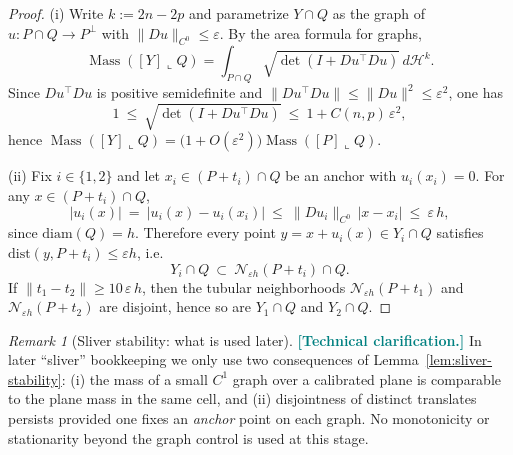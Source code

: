 \documentclass[11pt]{article}
\newcommand{\REVMZ}[1]{\textcolor{teal}{#1}}  %
\numberwithin{equation}{section}  %
\theoremstyle{plain}
\theoremstyle{definition}
\theoremstyle{remark}
\newtheorem{remark}[theorem]{Remark}
\DeclareMathOperator{\Mass}{Mass}
\newcommand{\dist}{\mathrm{dist}}
\begin{document}
\begin{proof}

\textnormal{(i)} Write $k:=2n-2p$ and parametrize $Y\cap Q$ as the graph of $u:P\cap Q\to P^\perp$ with $\|Du\|_{C^0}\le\varepsilon$.
By the area formula for graphs,
\[
\Mass([Y]\llcorner Q)
=\int_{P\cap Q}\sqrt{\det(I+Du^\top Du)}\,d\mathcal H^{k}.
\]
Since $Du^\top Du$ is positive semidefinite and $\|Du^\top Du\|\le \|Du\|^2\le \varepsilon^2$, one has
\[
1\ \le\ \sqrt{\det(I+Du^\top Du)}\ \le\ 1+C(n,p)\,\varepsilon^2,
\]
hence $\Mass([Y]\llcorner Q)=\bigl(1+O(\varepsilon^2)\bigr)\Mass([P]\llcorner Q)$.

\textnormal{(ii)} Fix $i\in\{1,2\}$ and let $x_i\in (P+t_i)\cap Q$ be an anchor with $u_i(x_i)=0$.
For any $x\in (P+t_i)\cap Q$,
\[
|u_i(x)|\ =\ |u_i(x)-u_i(x_i)|\ \le\ \|Du_i\|_{C^0}\,|x-x_i|\ \le\ \varepsilon\,h,
\]
since $\mathrm{diam}(Q)=h$.
Therefore every point $y=x+u_i(x)\in Y_i\cap Q$ satisfies
$\dist(y,P+t_i)\le \varepsilon h$, i.e.
\[
Y_i\cap Q\ \subset\ \mathcal N_{\varepsilon h}(P+t_i)\cap Q.
\]
If $\|t_1-t_2\|\ge 10\,\varepsilon\,h$, then the tubular neighborhoods
$\mathcal N_{\varepsilon h}(P+t_1)$ and $\mathcal N_{\varepsilon h}(P+t_2)$ are disjoint, hence so are $Y_1\cap Q$ and $Y_2\cap Q$.

\end{proof}


\begin{remark}[Sliver stability: what is used later]\label{rem:sliver-stability-discussion}
\REVMZ{\textbf{[Technical clarification.]}}
In later ``sliver'' bookkeeping we only use two consequences of Lemma~\ref{lem:sliver-stability}:
(i) the mass of a small $C^1$ graph over a calibrated plane is comparable to the plane mass in the same cell,
and (ii) disjointness of distinct translates persists provided one fixes an \emph{anchor} point on each graph.
No monotonicity or stationarity beyond the graph control is used at this stage.
\end{remark}
\end{document}
